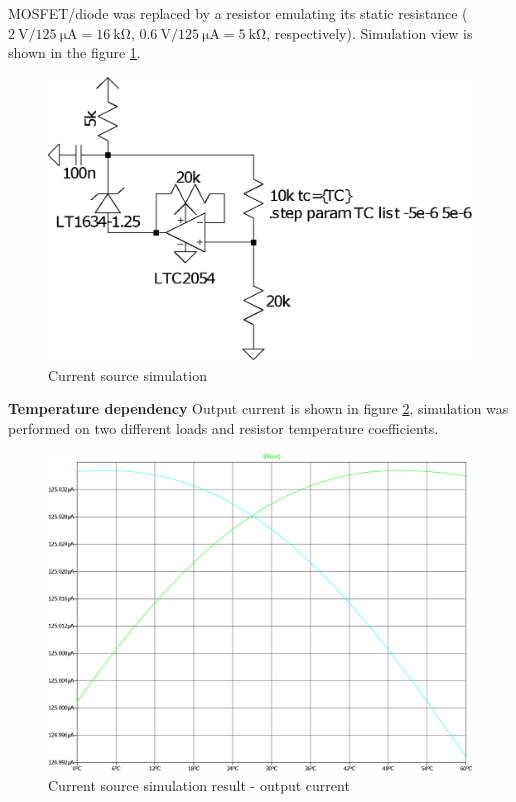         MOSFET/diode was replaced by a resistor emulating its static resistance ($\SI{2}{\volt}/\SI{125}{\micro\ampere} = \SI{16}{\kilo\ohm}$, $\SI{0.6}{\volt}/\SI{125}{\micro\ampere} = \SI{5}{\kilo\ohm}$, respectively). Simulation view is shown in the figure \ref{current_source_simulation}.

        \begin{figure}[H]
            \centering
            \includegraphics[width=0.5\paperwidth]{img/06/current_source.eps}
            \caption{Current source simulation}
            \label{current_source_simulation}
        \end{figure}

        \bigskip\textbf{Temperature dependency}
        Output current is shown in figure \ref{current_source_simulation_result}, simulation was performed on two different loads and resistor temperature coefficients.
        \begin{figure}[H]
            \centering
            \includegraphics[width=0.8\paperwidth]{img/06/current_source_result.eps}
            \caption{Current source simulation result - output current}
            \label{current_source_simulation_result}
        \end{figure}

